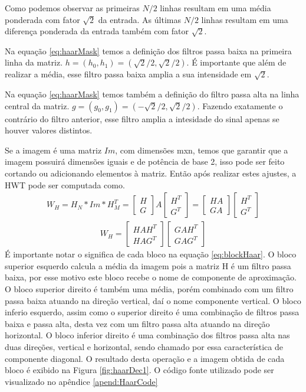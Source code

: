 \documentclass[
	article,			%
	11pt,				%
	oneside,			%
	a4paper,			%
	english,			%
	brazil,				%
	sumario=tradicional
	]{abntex2}
\begin{document}
Como podemos observar as primeiras $N/2$ linhas resultam em uma média ponderada
com fator $\sqrt{2}$ da entrada. As últimas $N/2$ linhas resultam em uma diferença
ponderada da entrada também com fator $\sqrt{2}$.

Na equação \ref{eq:haarMask} temos a definição dos filtros passa baixa na
primeira linha da matriz. $h=(h_0,h_1)=(\sqrt{2}/2,\sqrt{2}/2)$. É importante
que além de realizar a média, esse filtro passa baixa amplia a sua intensidade
em $\sqrt{2}$.

Na equação \ref{eq:haarMask} temos também a definição do filtro passa alta na
linha central da matriz. $g=(g_0,g_1)=(-\sqrt{2}/2,\sqrt{2}/2)$. Fazendo
exatamente o contrário do filtro anterior, esse filtro amplia a intesidade do
sinal apenas se houver valores distintos.

Se a imagem é uma matriz $Im$, com dimensões mxn, temos que garantir que a
imagem possuirá dimensões iguais e de potência de base 2, isso pode ser feito
cortando ou adicionando elementos à matriz.
Então após realizar estes ajustes, a HWT pode ser computada como.
\begin{align}
W_H=H_N*Im*H_M^{T} =
\begin{bmatrix} H \\ G \end{bmatrix}
A
\begin{bmatrix} H^T \\ G^T \end{bmatrix}
=
\begin{bmatrix} HA \\ GA \end{bmatrix}
\begin{bmatrix} H^T \\ G^T \end{bmatrix}
\end{align}
\begin{align}
W_H=
\begin{bmatrix} HAH^T \\ HAG^T \end{bmatrix}
\begin{bmatrix} GAH^T \\ GAG^T \end{bmatrix}
\label{eq:blockHaar}
\end{align}
É importante notar o significa de cada bloco na equação \ref{eq:blockHaar}.
O bloco superior esquerdo calcula a média da imagem pois a matriz H é um filtro
passa baixa, por esse motivo este bloco recebe o nome de componente de
aproximação.
O bloco superior direito é também uma média, porém combinado com um filtro passa
baixa atuando na direção vertical, daí o nome componente vertical.
O bloco inferio esquerdo, assim como o superior direito é uma combinação de
filtros passa baixa e passa alta, desta vez com um filtro passa alta atuando na
direção horizontal.
O bloco inferior direito é uma combinação dos filtros passa alta nas duas
direções, vertical e horizontal, sendo chamado por essa característica de
componente diagonal.
O resultado desta operação e a imagem obtida de cada bloco é exibido na Figura
\ref{fig:haarDec1}.
O código fonte utilizado pode ser visualizado no apêndice \ref{apend:HaarCode}
\end{document}
